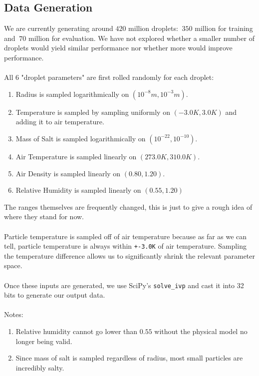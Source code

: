 \documentclass{article}
\begin{document}
\subsection{Data Generation}
We are currently generating around $420$ million droplets: $~350$ million for training and $~70$ million for evaluation. We have not explored whether a smaller number of droplets would yield similar performance nor whether more would improve performance.\\\\
All 6 "droplet parameters" are first rolled randomly for each droplet:
\begin{enumerate}
	\item Radius is sampled logarithmically on $(10^{-8}m, 10^{-3}m)$.
	\item Temperature is sampled by sampling uniformly on $(-3.0K, 3.0K)$ and adding it to air temperature.
	\item Mass of Salt is sampled logarithmically on $(10^{-22}, 10^{-10})$.
	\item Air Temperature is sampled linearly on $(273.0K, 310.0K)$.
	\item Air Density is sampled linearly on $(0.80, 1.20)$.
	\item Relative Humidity is sampled linearly on $(0.55, 1.20)$
\end{enumerate}
The ranges themselves are frequently changed, this is just to give a rough idea of where they stand for now.\\\\
Particle temperature is sampled off of air temperature because as far as we can tell, particle temperature is always within \lstinline{+-3.0K} of air temperature. Sampling the temperature difference allows us to significantly shrink the relevant parameter space.\\\\
Once these inputs are generated, we use SciPy's \lstinline{solve_ivp} and cast it into 32 bits to generate our output data.\\\\
Notes:
\begin{enumerate}
	\item Relative humidity cannot go lower than $0.55$ without the physical model no longer being valid.
	\item Since mass of salt is sampled regardless of radius, most small particles are incredibly salty.
\end{enumerate}
\end{document}
